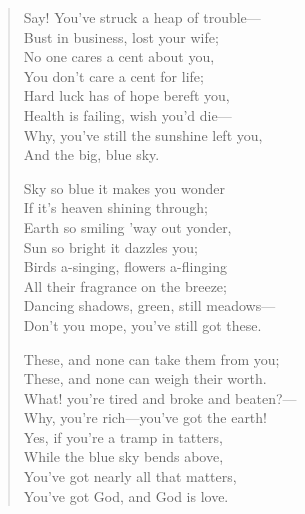 

\begin{verse}
Say! You've struck a heap of trouble—\\
\hspace*{3em}Bust in business, lost your wife;\\
No one cares a cent about you,\\
\hspace*{3em}You don't care a cent for life;\\
Hard luck has of hope bereft you,\\
\hspace*{3em}Health is failing, wish you'd die—\\
Why, you've still the sunshine left you,\\
\hspace*{3em}And the big, blue sky.

\hspace*{6em}Sky so blue it makes you wonder\\
\hspace*{9em}If it's heaven shining through;\\
\hspace*{6em}Earth so smiling 'way out yonder,\\
\hspace*{9em}Sun so bright it dazzles you;\\
\hspace*{6em}Birds a-singing, flowers a-flinging\\
\hspace*{9em}All their fragrance on the breeze;\\
\hspace*{6em}Dancing shadows, green, still meadows—\\
\hspace*{9em}Don't you mope, you've still got these.

These, and none can take them from you;\\
\hspace*{3em}These, and none can weigh their worth.\\
What! you're tired and broke and beaten?—\\
\hspace*{3em}Why, you're rich—you've got the earth!\\
Yes, if you're a tramp in tatters,\\
\hspace*{3em}While the blue sky bends above,\\
You've got nearly all that matters,\\
\hspace*{3em}You've got God, and God is love.

\end{verse}

